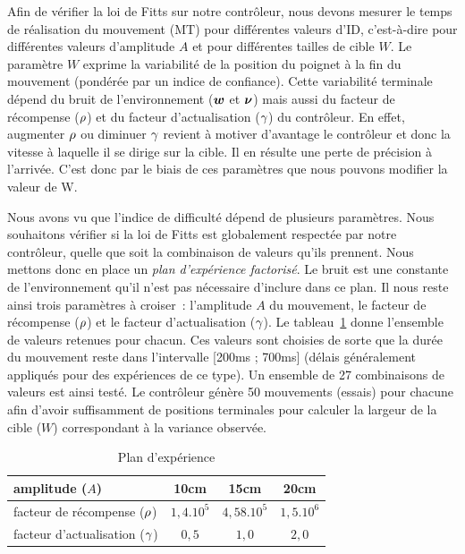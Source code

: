 \documentclass[pdftex,a4paper,11pt]{article}
\begin{document}
Afin de vérifier la loi de Fitts sur notre contrôleur, nous devons mesurer le
temps de réalisation du mouvement ($\text{MT}$) pour différentes valeurs
d'$\text{ID}$, c'est-à-dire pour différentes valeurs d'amplitude $A$ et pour
différentes tailles de cible $W$.
Le paramètre $W$ exprime la variabilité de la position du poignet à la fin du
mouvement (pondérée par un indice de confiance).
Cette variabilité terminale dépend du bruit de l'environnement ($\boldsymbol{w}$ et
$\boldsymbol{\nu}$) mais aussi du facteur de récompense ($\rho$) et du facteur
d'actualisation ($\gamma$) du contrôleur.
En effet, augmenter $\rho$ ou diminuer $\gamma$ revient à
motiver d'avantage le contrôleur et donc la vitesse à laquelle il se dirige sur
la cible. Il en résulte une perte de précision à l'arrivée.
C'est donc par le biais de ces paramètres que nous pouvons modifier la valeur
de W.

Nous avons vu que l'indice de difficulté dépend de plusieurs paramètres.
Nous souhaitons vérifier si la loi de Fitts est globalement respectée par notre
contrôleur, quelle que soit la combinaison de valeurs qu'ils prennent.
Nous mettons donc en place un {\em plan d'expérience factorisé}.
Le bruit est une constante de l'environnement qu'il n'est pas nécessaire
d'inclure dans ce plan.
Il nous reste ainsi trois paramètres à croiser~: l'amplitude $A$ du mouvement,
le facteur de récompense ($\rho$) et le facteur d'actualisation
($\gamma$). Le tableau~\ref{tab:fitts-params} donne l'ensemble de
valeurs retenues pour chacun. Ces valeurs sont choisies de sorte que la durée
du mouvement reste dans l'intervalle [200ms ; 700ms] (délais généralement
appliqués pour des expériences de ce type).
Un ensemble de 27 combinaisons de valeurs est ainsi testé.
Le contrôleur génère 50 mouvements (essais) pour chacune afin d'avoir
suffisamment de positions terminales pour calculer la largeur de la cible
($W$) correspondant à la variance observée.

\begin{table}[htp]
    \centering
    \begin{tabular}{|l|c|c|c|}
        \hline
        amplitude ($A$)                             & 10cm       & 15cm        & 20cm \\
        \hline
        facteur de récompense ($\rho$)     & $1,4.10^5$ & $4,58.10^5$ & $1,5.10^6$ \\
        \hline
        facteur d'actualisation ($\gamma$) & $0,5$      & $1,0$       & $2,0$ \\
        \hline
    \end{tabular}
    \caption{Plan d'expérience}
    \label{tab:fitts-params}
\end{table}
\end{document}

